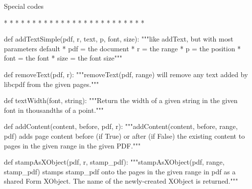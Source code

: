     Special codes

      * %
      * %
      * %
      * %
      * %
      * %
      * %
      * %
      * %
      * %
      * %
      * %
      * %
      * %
      * %
      * %
      * %
      * %
      * %
      * %
      * %
      * %
      * %
      * %
      * %

def addTextSimple(pdf, r, text, p, font, size):
    """like addText, but with most parameters default
         * pdf = the document
         * r = the range
         * p = the position
         * font = the font
         * size = the font size"""

def removeText(pdf, r):
    """removeText(pdf, range) will remove any text added by libcpdf from the
    given pages."""

def textWidth(font, string):
    """Return the width of a given string in the given font in thousandths of a
    point."""

def addContent(content, before, pdf, r):
    """addContent(content, before, range, pdf) adds page content before (if
    True) or after (if False) the existing content to pages in the given range
    in the given PDF."""

def stampAsXObject(pdf, r, stamp_pdf):
    """stampAsXObject(pdf, range, stamp_pdf) stamps stamp_pdf onto the pages
    in the given range in pdf as a shared Form XObject. The name of the
    newly-created XObject is returned."""
